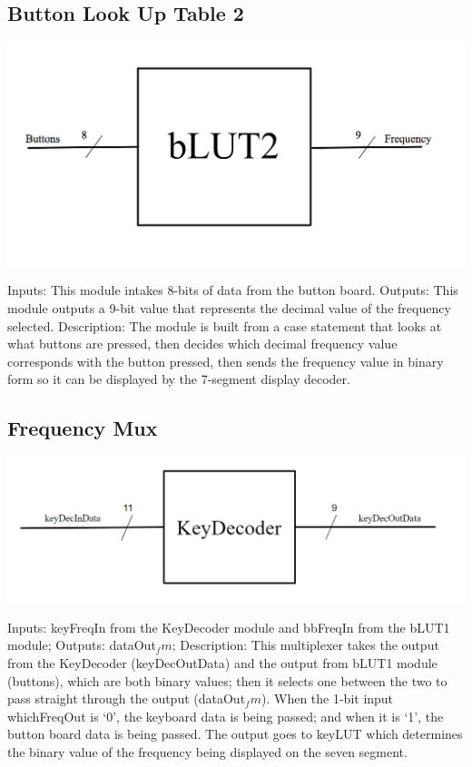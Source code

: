 \documentclass[a4paper]{article}
\begin{document}
\subsection{Button Look Up Table 2}

    \includegraphics[width=6 in]{./Images/jackPictures/blut2.png}


Inputs: This module intakes 8-bits of data from the button board.
\newline\newline
Outputs: This module outputs a 9-bit value that represents the decimal value of the frequency selected.
\newline\newline
Description: The module is built from a case statement that looks at what buttons are pressed, then decides which decimal frequency value corresponds with the button pressed, then sends the frequency value in binary form so it can be displayed by the 7-segment display decoder.


\subsection{Frequency Mux}

    \includegraphics[width=6 in]{./Images/DiagramsYang/keyDec.png}


Inputs: keyFreqIn from the KeyDecoder module and bbFreqIn from the bLUT1 module;
\newline\newline
Outputs: dataOut${_fm}$;
\newline\newline
Description: This multiplexer takes the output from the KeyDecoder (keyDecOutData) and the output from bLUT1 module (buttons), which are both binary values; then it selects one between the two to pass straight through the output  (dataOut${_fm}$). When the 1-bit input whichFreqOut is ‘0’, the keyboard data is being passed; and when it is ‘1’, the button board data is being passed. The output goes to keyLUT which determines the binary value of the frequency being displayed on the seven segment. 
\end{document}
